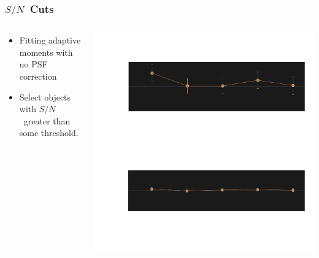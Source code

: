 \documentclass{beamer}
\newcommand{\snr}{$S/N$}
\begin{document}
\frame
{
    \frametitle{\snr\ Cuts}
 

    \begin{columns}
        \begin{column}{0.4\textwidth}
            \begin{itemize}
                \item Fitting adaptive moments with no PSF correction
                \item Select objects with \snr\ greater than some threshold.
            \end{itemize}
        \end{column}
        \begin{column}{0.6\textwidth}
            \begin{center}
            \includegraphics[width=\textwidth]{mc-select-bias-thresh-inv.pdf}
                \newline
            \end{center}
        \end{column}
    \end{columns}


}
\end{document}
